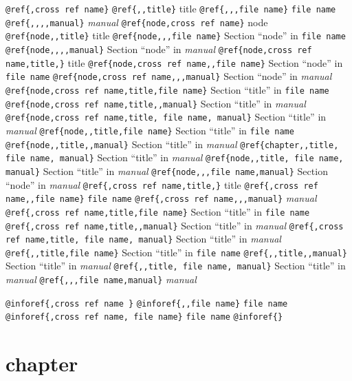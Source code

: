 \documentclass{book}
\makeatletter
\renewcommand\mainmatter{\clearpage\@mainmattertrue\pagenumbering{arabic}}
\newcommand\GNUTexinfomainmatter{\mainmatter}
\newcommand{\GNUTexinfosetsingleheader}{\pagestyle{single}}
\makeatother
\begin{document}
\begin{titlepage}
\texttt{@ref\{,cross ref name\}} 
\texttt{@ref\{,,title\}} title
\texttt{@ref\{,,,file name\}} \texttt{file name}
\texttt{@ref\{,,,,manual\}} \textsl{manual}
\texttt{@ref\{node,cross ref name\}} node
\texttt{@ref\{node,,title\}} title
\texttt{@ref\{node,,,file name\}} Section ``node'' in \texttt{file name}
\texttt{@ref\{node,,,,manual\}} Section ``node'' in \textsl{manual}
\texttt{@ref\{node,cross ref name,title,\}} title
\texttt{@ref\{node,cross ref name,,file name\}} Section ``node'' in \texttt{file name}
\texttt{@ref\{node,cross ref name,,,manual\}} Section ``node'' in \textsl{manual}
\texttt{@ref\{node,cross ref name,title,file name\}} Section ``title'' in \texttt{file name}
\texttt{@ref\{node,cross ref name,title,,manual\}} Section ``title'' in \textsl{manual}
\texttt{@ref\{node,cross ref name,title, file name, manual\}} Section ``title'' in \textsl{manual}
\texttt{@ref\{node,,title,file name\}} Section ``title'' in \texttt{file name}
\texttt{@ref\{node,,title,,manual\}} Section ``title'' in \textsl{manual}
\texttt{@ref\{chapter,,title, file name, manual\}} Section ``title'' in \textsl{manual}
\texttt{@ref\{node,,title, file name, manual\}} Section ``title'' in \textsl{manual}
\texttt{@ref\{node,,,file name,manual\}} Section ``node'' in \textsl{manual}
\texttt{@ref\{,cross ref name,title,\}} title
\texttt{@ref\{,cross ref name,,file name\}} \texttt{file name}
\texttt{@ref\{,cross ref name,,,manual\}} \textsl{manual}
\texttt{@ref\{,cross ref name,title,file name\}} Section ``title'' in \texttt{file name}
\texttt{@ref\{,cross ref name,title,,manual\}} Section ``title'' in \textsl{manual}
\texttt{@ref\{,cross ref name,title, file name, manual\}} Section ``title'' in \textsl{manual}
\texttt{@ref\{,,title,file name\}} Section ``title'' in \texttt{file name}
\texttt{@ref\{,,title,,manual\}} Section ``title'' in \textsl{manual}
\texttt{@ref\{,,title, file name, manual\}} Section ``title'' in \textsl{manual}
\texttt{@ref\{,,,file name,manual\}} \textsl{manual}

\texttt{@inforef\{,cross ref name \}} 
\texttt{@inforef\{,,file name\}} \texttt{file name}
\texttt{@inforef\{,cross ref name, file name\}} \texttt{file name}
\texttt{@inforef\{\}} 


\end{titlepage}
\GNUTexinfosetsingleheader{}%
\GNUTexinfomainmatter
\tableofcontents\newpage





\label{anchor:Top}%
\chapter{chapter}
\label{anchor:chapter}%
\end{document}
